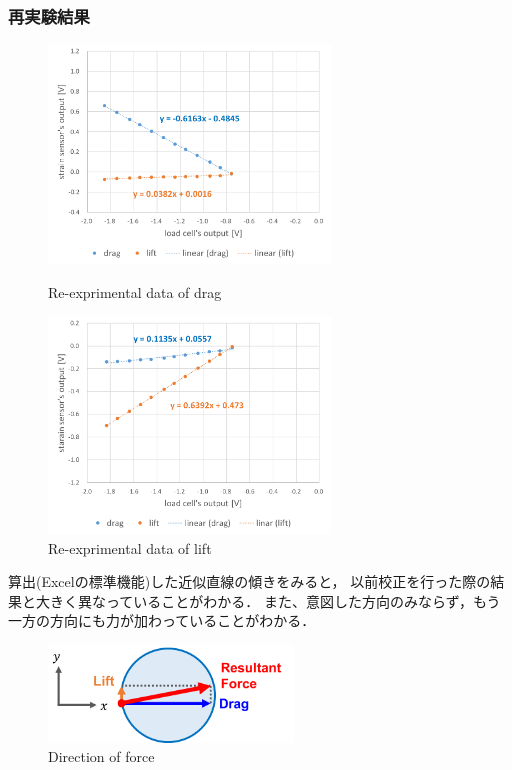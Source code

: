 \documentclass[twocolumn,a4j]{jsarticle}
\begin{document}
\subsubsection*{再実験結果}
\begin{figure}[htbp]
    \footnotesize
    \begin{center}
        \includegraphics[width=75mm]{../images/graph_21119_drag_1.png}
        \caption{Re-exprimental data of drag}
        \includegraphics[width=75mm]{../images/graph_21119_lift_1.png}
        \caption{Re-exprimental data of lift}
    \end{center}
\end{figure}

算出(Excelの標準機能)した近似直線の傾きをみると，
以前校正を行った際の結果と大きく異なっていることがわかる．
また、意図した方向のみならず，もう一方の方向にも力が加わっていることがわかる．\par

\begin{figure}[htbp]
    \footnotesize
    \begin{center}
        \includegraphics[width=65mm]{../images/image_11.png}
        \caption{Direction of force}
    \end{center}
\end{figure}
\end{document}
